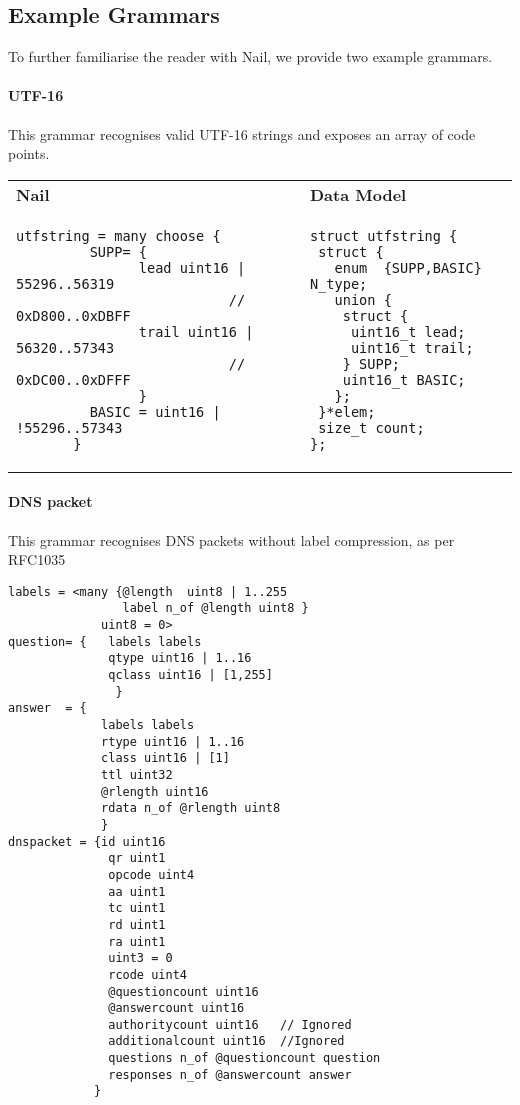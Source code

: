 \subsection{Example Grammars}
To further familiarise the reader with Nail, we provide two example grammars.
\paragraph{UTF-16}
This grammar recognises valid UTF-16 strings and exposes an array of code
points.

\begin{tabular}{ll}
  \textbf{Nail} & \textbf{Data Model}\\
  \begin{minipage}{3in}
\begin{verbatim}
utfstring = many choose {
         SUPP= {
               lead uint16 | 55296..56319
                          // 0xD800..0xDBFF
               trail uint16 | 56320..57343
                          // 0xDC00..0xDFFF
               }
         BASIC = uint16 | !55296..57343
       }
\end{verbatim}
  \end{minipage}
  & 
  \begin{minipage}{2in}
\begin{verbatim}
struct utfstring {
 struct {
   enum  {SUPP,BASIC} N_type;
   union {
    struct {
     uint16_t lead;
     uint16_t trail;
    } SUPP;
    uint16_t BASIC;
   };
 }*elem;
 size_t count;
};
\end{verbatim} 
  \end{minipage}
  \\
\end{tabular}

\paragraph{DNS packet}
This grammar recognises DNS packets without label compression, as per RFC1035
\begin{verbatim}
labels = <many {@length  uint8 | 1..255 
                label n_of @length uint8 }
             uint8 = 0>
question= {   labels labels
              qtype uint16 | 1..16 
              qclass uint16 | [1,255]
               }
answer  = {
             labels labels
             rtype uint16 | 1..16
             class uint16 | [1]
             ttl uint32
             @rlength uint16 
             rdata n_of @rlength uint8 
             }
dnspacket = {id uint16
              qr uint1
              opcode uint4
              aa uint1 
              tc uint1
              rd uint1
              ra uint1
              uint3 = 0
              rcode uint4
              @questioncount uint16
              @answercount uint16
              authoritycount uint16   // Ignored
              additionalcount uint16  //Ignored       
              questions n_of @questioncount question         
              responses n_of @answercount answer
            }
\end{verbatim}


